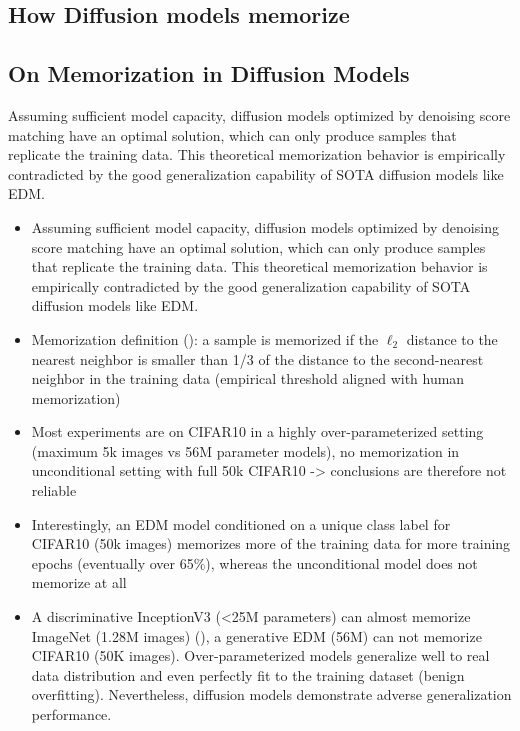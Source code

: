 \documentclass{article}
\begin{document}
\subsection{How Diffusion models memorize}

\subsection{On Memorization in Diffusion Models}
\begin{tldr}
    Assuming sufficient model capacity, diffusion models optimized by denoising score matching have an optimal solution, which can only produce samples that replicate the training data. This theoretical memorization behavior is empirically contradicted by the good generalization capability of SOTA diffusion models like EDM.
\end{tldr}
\begin{itemize}
    \item Assuming sufficient model capacity, diffusion models optimized by denoising score matching have an optimal solution, which can only produce samples that replicate the training data. This theoretical memorization behavior is empirically contradicted by the good generalization capability of SOTA diffusion models like EDM.
    \item Memorization definition (\cite{yoon2023diffusion}): a sample is memorized if the $\ell_2$ distance to the nearest neighbor is smaller than 1/3 of the distance to the second-nearest neighbor in the training data (empirical threshold aligned with human memorization)
    \item Most experiments are on CIFAR10 in a highly over-parameterized setting (maximum 5k images vs 56M parameter models), no memorization in unconditional setting with full 50k CIFAR10 -> conclusions are therefore not reliable
    \item Interestingly, an EDM model conditioned on a unique class label for CIFAR10 (50k images) memorizes more of the training data for more training epochs (eventually over 65\%), whereas the unconditional model does not memorize at all
    \item A discriminative InceptionV3 (<25M parameters) can almost memorize ImageNet (1.28M images) (\cite{zhang2016understanding}), a generative EDM (56M) can not memorize CIFAR10 (50K images). Over-parameterized models generalize well to real data distribution and even perfectly fit to the training dataset (benign overfitting). Nevertheless, diffusion models demonstrate adverse generalization performance.
\end{itemize}
\end{document}
